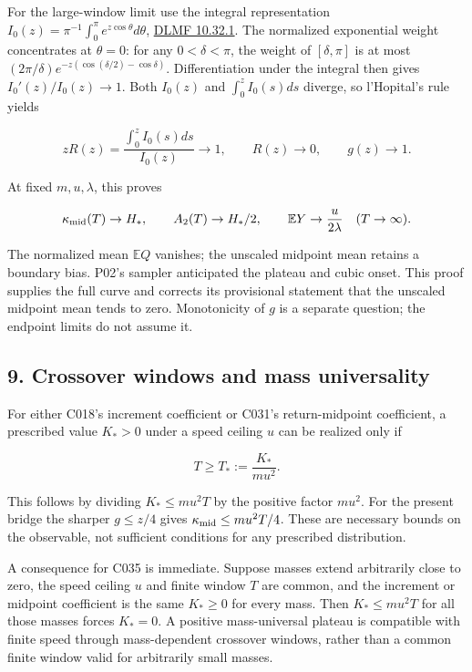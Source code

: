 \documentclass[11pt,a4paper]{article}
\begin{document}
For the large-window limit use the integral representation
\(I_0(z)=\pi^{-1}\int_0^\pi e^{z\cos\theta}d\theta\),
\href{https://dlmf.nist.gov/10.32.E1}{DLMF 10.32.1}. The normalized
exponential weight concentrates at \(\theta=0\): for any
\(0<\delta<\pi\), the weight of \([\delta,\pi]\) is at most
\((2\pi/\delta)e^{-z(\cos(\delta/2)-\cos\delta)}\). Differentiation
under the integral then gives \(I_0'(z)/I_0(z)\to1\). Both \(I_0(z)\)
and \(\int_0^zI_0(s)ds\) diverge, so l'Hopital's rule yields

\[zR(z)=\frac{\int_0^zI_0(s)ds}{I_0(z)}\longrightarrow1,
\qquad R(z)\longrightarrow0,\qquad g(z)\longrightarrow1.\]

At fixed \(m,u,\lambda\), this proves

\[\kappa_{\rm mid}(T)\to H_*,\qquad A_2(T)\to H_*/2,
\qquad \mathbb E Y\to\frac{u}{2\lambda}\quad(T\to\infty).\]

The normalized mean \(\mathbb E Q\) vanishes; the unscaled midpoint mean
retains a boundary bias. P02's sampler anticipated the plateau and cubic
onset. This proof supplies the full curve and corrects its provisional
statement that the unscaled midpoint mean tends to zero. Monotonicity of
\(g\) is a separate question; the endpoint limits do not assume it.

\hypertarget{crossover-windows-and-mass-universality}{%
\subsection{9. Crossover windows and mass
universality}\label{crossover-windows-and-mass-universality}}

For either C018's increment coefficient or C031's return-midpoint
coefficient, a prescribed value \(K_*>0\) under a speed ceiling \(u\)
can be realized only if

\[T\ge T_*:=\frac{K_*}{mu^2}.\]

This follows by dividing \(K_*\le mu^2T\) by the positive factor
\(mu^2\). For the present bridge the sharper \(g\le z/4\) gives
\(\kappa_{\rm mid}\le mu^2T/4\). These are necessary bounds on the
observable, not sufficient conditions for any prescribed distribution.

A consequence for C035 is immediate. Suppose masses extend arbitrarily
close to zero, the speed ceiling \(u\) and finite window \(T\) are
common, and the increment or midpoint coefficient is the same
\(K_*\ge0\) for every mass. Then \(K_*\le mu^2T\) for all those masses
forces \(K_*=0\). A positive mass-universal plateau is compatible with
finite speed through mass-dependent crossover windows, rather than a
common finite window valid for arbitrarily small masses.
\end{document}
